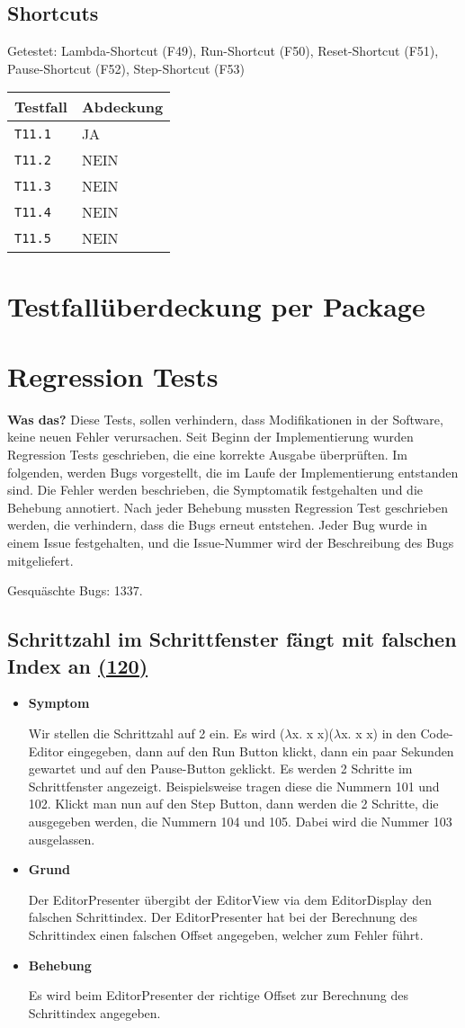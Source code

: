 \documentclass[parskip=full,11pt,twoside]{scrartcl}
\newcommand{\issueref}[1]{
    \href{https://git.scc.kit.edu/ap/Aurora/issues/#1}{(#1)}
}
\newcommand{\regrtest}[5]{
    \subsection{#1 \issueref{#2}}
    \begin{itemize}
        \item \textbf{Symptom}
            #3
        \item \textbf{Grund}
            #4
        \item \textbf{Behebung}
            #5
    \end{itemize}
}
\newcommand{\testline}[2]{
    \texttt{#1} & \ifthenelse{\equal{#2}{JA}}{\cellcolor{green!20}}{\cellcolor{red!20}}#2 \\ \hline
}
\begin{document}
\subsection{Shortcuts}
    Getestet:
    Lambda-Shortcut (F49),
    Run-Shortcut (F50),
    Reset-Shortcut (F51),
    Pause-Shortcut (F52),
    Step-Shortcut (F53)

    \label{shortcuts}
    \begin{center}
        \begin{tabular}{ p{9cm} p{4cm}}
            Testfall & Abdeckung \\ \hline
            \testline{T11.1}{JA}
            \testline{T11.2}{NEIN}
            \testline{T11.3}{NEIN}
            \testline{T11.4}{NEIN}
            \testline{T11.5}{NEIN}
        \end{tabular}
    \end{center}

\section{Testfallüberdeckung per Package}

\section{Regression Tests}
    \textbf{Was das?}
    Diese Tests, sollen verhindern, dass Modifikationen in der Software, 
    keine neuen Fehler verursachen. Seit Beginn der Implementierung wurden Regression Tests
    geschrieben, die eine korrekte Ausgabe überprüften.
    Im folgenden, werden Bugs vorgestellt, die im Laufe der Implementierung entstanden
    sind. Die Fehler werden beschrieben, die Symptomatik festgehalten und die Behebung annotiert.
    Nach jeder Behebung mussten Regression Test geschrieben werden, die verhindern, dass die Bugs erneut entstehen.
    Jeder Bug wurde in einem Issue festgehalten, und die Issue-Nummer wird der Beschreibung des Bugs mitgeliefert.
    
    Gesquäschte Bugs: 1337.

    \regrtest{Schrittzahl im Schrittfenster fängt mit falschen Index an}{120}{
        Wir stellen die Schrittzahl auf 2 ein.
        Es wird ($\lambda$x. x x)($\lambda$x. x x) in den Code-Editor eingegeben,
            dann auf den Run Button klickt, dann ein paar Sekunden gewartet und auf den Pause-Button geklickt.
        Es werden 2 Schritte im Schrittfenster angezeigt.
        Beispielsweise tragen diese die Nummern 101 und 102.
        Klickt man nun auf den Step Button, dann werden die 2 Schritte, die ausgegeben werden, die Nummern 104 und 105.
        Dabei wird die Nummer 103 ausgelassen.
    }{
        Der EditorPresenter übergibt der EditorView via dem EditorDisplay den falschen Schrittindex.
        Der EditorPresenter hat bei der Berechnung des Schrittindex einen falschen Offset angegeben, welcher zum Fehler führt.
    }{
        Es wird beim EditorPresenter der richtige Offset zur Berechnung des Schrittindex angegeben.
    }
\end{document}
